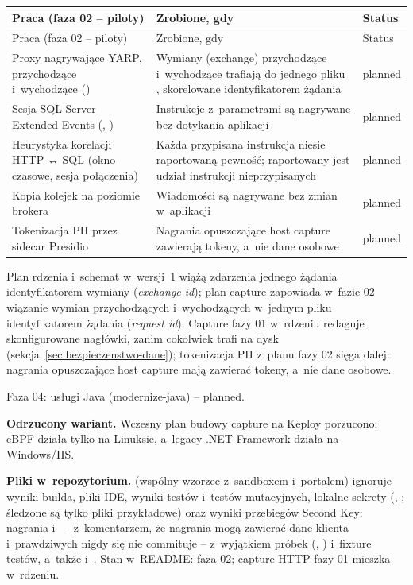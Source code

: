 \begin{xltabular}{\linewidth}{@{}>{\raggedright\arraybackslash}p{5.0cm} >{\raggedright\arraybackslash}X >{\raggedright\arraybackslash}p{1.6cm}@{}}
\toprule
Praca (faza 02 -- piloty) & Zrobione, gdy & Status \\
\midrule
\endfirsthead
\toprule
Praca (faza 02 -- piloty) & Zrobione, gdy & Status \\
\midrule
\endhead
Proxy nagrywające YARP, przychodzące i~wychodzące () & Wymiany (exchange) przychodzące i~wychodzące trafiają do jednego pliku , skorelowane identyfikatorem żądania & planned \\
Sesja SQL Server Extended Events (, ) & Instrukcje z~parametrami są nagrywane bez dotykania aplikacji & planned \\
Heurystyka korelacji HTTP ↔ SQL (okno czasowe, sesja połączenia) & Każda przypisana instrukcja niesie raportowaną pewność; raportowany jest udział instrukcji nieprzypisanych & planned \\
Kopia kolejek na poziomie brokera & Wiadomości są nagrywane bez zmian w~aplikacji & planned \\
Tokenizacja PII przez sidecar Presidio & Nagrania opuszczające host capture zawierają tokeny, a~nie dane osobowe & planned \\
\bottomrule
\end{xltabular}

Plan rdzenia i~schemat  w~wersji~1 wiążą zdarzenia jednego żądania
identyfikatorem wymiany (\emph{exchange id}); plan capture zapowiada w~fazie 02 wiązanie
wymian przychodzących i~wychodzących w~jednym pliku identyfikatorem żądania
(\emph{request id}). Capture fazy 01 w~rdzeniu redaguje skonfigurowane nagłówki, zanim
cokolwiek trafi na dysk (sekcja~\ref{sec:bezpieczenstwo-dane}); tokenizacja PII z~planu
fazy 02 sięga dalej: nagrania opuszczające host capture mają zawierać tokeny, a~nie dane
osobowe.

Faza 04: usługi Java (modernize-java) -- planned.

\textbf{Odrzucony wariant.} Wczesny plan budowy capture na Keploy porzucono: eBPF działa tylko
na Linuksie, a~legacy .NET Framework działa na Windows/IIS.

\textbf{Pliki w~repozytorium.}  (wspólny wzorzec z~sandboxem i~portalem)
ignoruje wyniki builda, pliki IDE, wyniki testów i~testów mutacyjnych, lokalne sekrety
(, ; śledzone są tylko pliki przykładowe) oraz wyniki przebiegów
Second Key: nagrania  i~ -- z~komentarzem, że nagrania
mogą zawierać dane klienta i~prawdziwych nigdy się nie commituje -- z~wyjątkiem próbek
(, ) i~fixture testów, a~także 
i~. Stan w~README: faza 02; capture HTTP fazy 01 mieszka w~rdzeniu.

